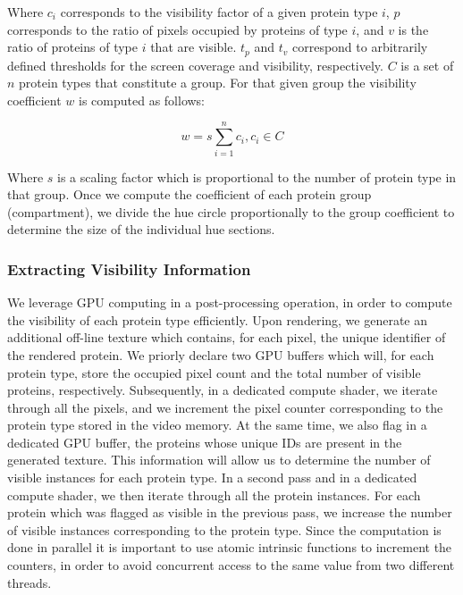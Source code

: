 \documentclass[review,journal]{vgtc}         %
\begin{document}
	Where $c_i$ corresponds to the visibility factor of a given protein type $i$, $p$ corresponds to the ratio of pixels occupied by proteins of type $i$, and $v$ is the ratio of proteins of type $i$ that are visible.
	$t_{p}$ and $t_{v}$ correspond to arbitrarily defined thresholds for the screen coverage and visibility, respectively. 
	$C$ is a set of $n$ protein types that constitute a group.
	For that given group the visibility coefficient $w$ is computed as follows:
	
	\begin{equation}
	w = s\sum_{i=1}^{n} c_{i}, c_{i} \in C
	\end{equation}
	
	Where $s$ is a scaling factor which is proportional to the number of protein type in that group. 
	Once we compute the coefficient of each protein group (compartment), we divide the hue circle proportionally to the group coefficient to determine the size of the individual hue sections. \\
	
	\subsubsection{Extracting Visibility Information}
	\label{sssec:extracting}
	We leverage GPU computing in a post-processing operation, in order to compute the visibility of each protein type efficiently.
	Upon rendering, we generate an additional off-line texture which contains, for each pixel, the unique identifier of the rendered protein.
	We priorly declare two GPU buffers which will, for each protein type, store the occupied pixel count and the total number of visible proteins, respectively.
	Subsequently, in a dedicated compute shader, we iterate through all the pixels, and we increment the pixel counter corresponding to the protein type stored in the video memory.
	At the same time, we also flag in a dedicated GPU buffer, the proteins whose unique IDs are present in the generated texture.
	This information will allow us to determine the number of visible instances for each protein type.
	In a second pass and in a dedicated compute shader, we then iterate through all the protein instances.
	For each protein which was flagged as visible in the previous pass, we increase the number of visible instances corresponding to the protein type.
	Since the computation is done in parallel it is important to use atomic intrinsic functions to increment the counters, in order to avoid concurrent access to the same value from two different threads.
	
\end{document}
